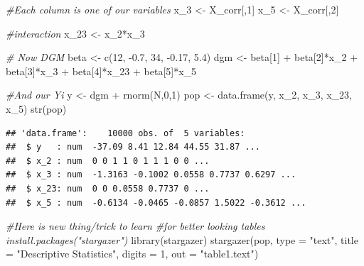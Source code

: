 \documentclass[
]{book}
\newenvironment{Shaded}{\begin{snugshade}}{\end{snugshade}}
\newcommand{\AttributeTok}[1]{\textcolor[rgb]{0.77,0.63,0.00}{#1}}
\newcommand{\CommentTok}[1]{\textcolor[rgb]{0.56,0.35,0.01}{\textit{#1}}}
\newcommand{\DecValTok}[1]{\textcolor[rgb]{0.00,0.00,0.81}{#1}}
\newcommand{\FloatTok}[1]{\textcolor[rgb]{0.00,0.00,0.81}{#1}}
\newcommand{\FunctionTok}[1]{\textcolor[rgb]{0.00,0.00,0.00}{#1}}
\newcommand{\NormalTok}[1]{#1}
\newcommand{\OtherTok}[1]{\textcolor[rgb]{0.56,0.35,0.01}{#1}}
\newcommand{\SpecialCharTok}[1]{\textcolor[rgb]{0.00,0.00,0.00}{#1}}
\newcommand{\StringTok}[1]{\textcolor[rgb]{0.31,0.60,0.02}{#1}}
\theoremstyle{definition}
\theoremstyle{definition}
\theoremstyle{definition}
\theoremstyle{definition}
\theoremstyle{remark}
\begin{document}
\begin{Shaded}
\begin{Highlighting}[]
\CommentTok{\#Each column is one of our variables}
\NormalTok{x\_3 }\OtherTok{\textless{}{-}}\NormalTok{ X\_corr[,}\DecValTok{1}\NormalTok{]}
\NormalTok{x\_5 }\OtherTok{\textless{}{-}}\NormalTok{ X\_corr[,}\DecValTok{2}\NormalTok{]}

\CommentTok{\#interaction}
\NormalTok{x\_23 }\OtherTok{\textless{}{-}}\NormalTok{ x\_2}\SpecialCharTok{*}\NormalTok{x\_3}
  
\CommentTok{\# Now DGM}
\NormalTok{beta }\OtherTok{\textless{}{-}} \FunctionTok{c}\NormalTok{(}\DecValTok{12}\NormalTok{, }\SpecialCharTok{{-}}\FloatTok{0.7}\NormalTok{, }\DecValTok{34}\NormalTok{, }\SpecialCharTok{{-}}\FloatTok{0.17}\NormalTok{, }\FloatTok{5.4}\NormalTok{)}
\NormalTok{dgm }\OtherTok{\textless{}{-}}\NormalTok{ beta[}\DecValTok{1}\NormalTok{] }\SpecialCharTok{+}\NormalTok{ beta[}\DecValTok{2}\NormalTok{]}\SpecialCharTok{*}\NormalTok{x\_2 }\SpecialCharTok{+}\NormalTok{ beta[}\DecValTok{3}\NormalTok{]}\SpecialCharTok{*}\NormalTok{x\_3 }\SpecialCharTok{+}\NormalTok{ beta[}\DecValTok{4}\NormalTok{]}\SpecialCharTok{*}\NormalTok{x\_23 }\SpecialCharTok{+}\NormalTok{ beta[}\DecValTok{5}\NormalTok{]}\SpecialCharTok{*}\NormalTok{x\_5}

\CommentTok{\#And our Yi}
\NormalTok{y }\OtherTok{\textless{}{-}}\NormalTok{ dgm }\SpecialCharTok{+} \FunctionTok{rnorm}\NormalTok{(N,}\DecValTok{0}\NormalTok{,}\DecValTok{1}\NormalTok{)}
\NormalTok{pop }\OtherTok{\textless{}{-}} \FunctionTok{data.frame}\NormalTok{(y, x\_2, x\_3, x\_23, x\_5)}
\FunctionTok{str}\NormalTok{(pop)}
\end{Highlighting}
\end{Shaded}

\begin{verbatim}
## 'data.frame':    10000 obs. of  5 variables:
##  $ y   : num  -37.09 8.41 12.84 44.55 31.87 ...
##  $ x_2 : num  0 0 1 1 0 1 1 1 0 0 ...
##  $ x_3 : num  -1.3163 -0.1002 0.0558 0.7737 0.6297 ...
##  $ x_23: num  0 0 0.0558 0.7737 0 ...
##  $ x_5 : num  -0.6134 -0.0465 -0.0857 1.5022 -0.3612 ...
\end{verbatim}

\begin{Shaded}
\begin{Highlighting}[]
\CommentTok{\#Here is new thing/trick to learn}
\CommentTok{\#for better looking tables install.packages("stargazer")}
\FunctionTok{library}\NormalTok{(stargazer)}
\FunctionTok{stargazer}\NormalTok{(pop, }\AttributeTok{type =} \StringTok{"text"}\NormalTok{, }\AttributeTok{title =} \StringTok{"Descriptive Statistics"}\NormalTok{,}
          \AttributeTok{digits =} \DecValTok{1}\NormalTok{, }\AttributeTok{out =} \StringTok{"table1.text"}\NormalTok{)}
\end{Highlighting}
\end{Shaded}
\end{document}
